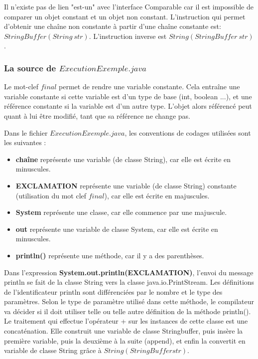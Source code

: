 \documentclass[a4paper,11pts]{article}
\begin{document}
\indent Il n'existe pas de lien "est-un" avec l'interface Comparable car il est impossible de comparer un objet constant et un objet non constant. L'instruction qui permet d'obtenir une chaîne non constante à partir d'une chaîne constante est: $StringBuffer(String\ str)$. L'instruction inverse est $String(StringBuffer\ str)$.

\subsubsection{La source de $ExecutionExemple.java$}
\indent Le mot-clef $final$ permet de rendre une variable constante. Cela entraîne une variable constante si cette variable est d'un type de base (int, boolean ...), et une référence constante si la variable est d'un autre type. L'objet alors référencé peut quant à lui être modifié, tant que sa référence ne change pas.

Dans le fichier $ExecutionExemple.java$, les conventions de codages utilisées sont les suivantes :
\begin{itemize}
\item \textbf{chaîne} représente une variable (de classe String), car elle est écrite en minuscules.
\item \textbf{EXCLAMATION} représente une variable (de classe String) constante (utilisation du mot clef $final$), car elle est écrite en majuscules.
\item \textbf{System} représente une classe, car elle commence par une majuscule.
\item \textbf{out} représente une variable de classe System, car elle est écrite en minuscules.
\item \textbf{println()} représente une méthode, car il y a des parenthèses.
\end{itemize}
\indent Dans l'expression \textbf{System.out.println(EXCLAMATION)}, l'envoi du message println se fait de la classe String vers la classe java.io.PrintStream. Les définitions de l'identificateur println sont différenciées par le nombre et le type des paramètres. Selon le type de paramètre utilisé dans cette méthode, le compilateur va décider si il doit utiliser telle ou telle autre définition de la méthode println(). Le traitement qui effectue l'opérateur + sur les instances de cette classe est une concaténation. Elle construit une variable de classe Stringbuffer, puis insère la première variable, puis la deuxième à la suite (append), et enfin la convertit en variable de classe String grâce à $String(StringBuffer str)$.
\end{document}
